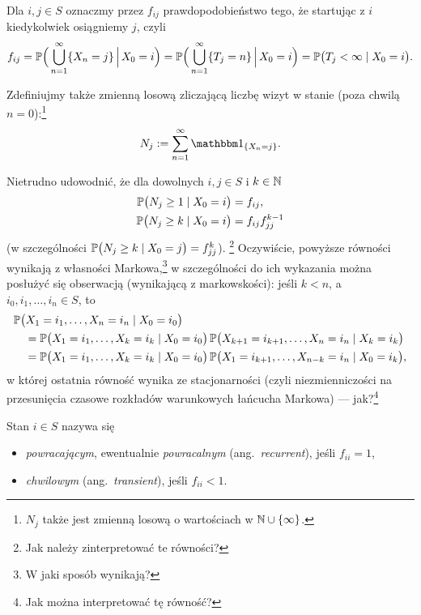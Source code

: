 \documentclass[dvipsnames]{book}
\begin{document}
Dla $i,j \in S$ oznaczmy przez $f_{ij}$ prawdopodobieństwo tego, że startując
z $i$ kiedykolwiek osiągniemy $j$, czyli
\[
  f_{ij}
  = \P\Big(\bigcup_{n=1}^{\infty} \{X_n = j\} \,\Big|\, X_0 = i\Big)
  = \P\Big(\bigcup_{n=1}^{\infty} \{T_j = n\} \,\Big|\, X_0 = i\Big)
  = \P\big(T_j < \infty \mid X_0 = i\big).
\]

Zdefiniujmy także zmienną losową zliczającą liczbę wizyt w stanie (poza chwilą
$n = 0$):\footnote{$N_j$ także jest zmienną losową o wartościach
w $\N \cup \{\infty\}$.}
\[
  N_j := \sum_{n=1}^{\infty} \ind_{\{X_n = j\}}.
\]

Nietrudno udowodnić, że dla dowolnych $i,j \in S$ i $k \in \N$
\begin{align*}
  \P\big(N_j \geq 1 \mid X_0 = i\big) &= f_{ij}, \\
  \P\big(N_j \geq k \mid X_0 = i\big) &= f_{ij} f_{jj}^{k-1}
\end{align*}
(w szczególności $\P\big(N_j \geq k \mid X_0 = j\big) = f_{jj}^k$).%
\footnote{Jak należy zinterpretować te równości?}
Oczywiście, powyższe równości wynikają z własności Markowa,\footnote{W jaki
sposób wynikają?} w szczególności do ich wykazania można posłużyć się
obserwacją (wynikającą z markowskości): jeśli $k < n$, a
$i_0, i_1, \ldots, i_n \in S$, to
\begin{align*}
  &\P\big(X_1 = i_1, \ldots, X_n = i_n \mid X_0 = i_0\big) \\
  &\quad= \P\big(X_1 = i_1, \ldots, X_k = i_k \mid X_0 = i_0\big)\,
    \P\big(X_{k+1} = i_{k+1}, \ldots, X_n = i_n \mid X_k = i_k\big) \\
  &\quad= \P\big(X_1 = i_1, \ldots, X_k = i_k \mid X_0 = i_0\big)\,
    \P\big(X_1 = i_{k+1}, \ldots, X_{n-k} = i_n \mid X_0 = i_k\big),
\end{align*}
w której ostatnia równość wynika ze stacjonarności (czyli niezmienniczości na
przesunięcia czasowe rozkładów warunkowych łańcucha Markowa) ---
jak?\footnote{Jak można interpretować tę równość?}

\begin{definicja}
Stan $i \in S$ nazywa się
\begin{itemize}[topsep=0pt,itemsep=0pt]
  \item \emph{powracającym}, ewentualnie \emph{powracalnym}
  (ang.\ \emph{recurrent}), jeśli $f_{ii} = 1$,
  \item \emph{chwilowym} (ang.\ \emph{transient}), jeśli $f_{ii} < 1$.
\end{itemize}
\end{definicja}
\end{document}
